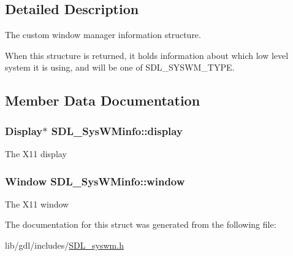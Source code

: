 \subsection{Detailed Description}
The custom window manager information structure.

When this structure is returned, it holds information about which low level system it is using, and will be one of S\+D\+L\+\_\+\+S\+Y\+S\+W\+M\+\_\+\+T\+Y\+P\+E. 

\subsection{Member Data Documentation}
\hypertarget{struct_s_d_l___sys_w_minfo_a58ef8bc8e1065e95e75a08d08f4a4741}{}
\subsubsection[{display}]{\setlength{\rightskip}{0pt plus 5cm}Display$\ast$ S\+D\+L\+\_\+\+Sys\+W\+Minfo\+::display}\label{struct_s_d_l___sys_w_minfo_a58ef8bc8e1065e95e75a08d08f4a4741}
The X11 display \hypertarget{struct_s_d_l___sys_w_minfo_a83ca4b0f4bdf67a0edee03d5bde86b93}{}
\subsubsection[{window}]{\setlength{\rightskip}{0pt plus 5cm}Window S\+D\+L\+\_\+\+Sys\+W\+Minfo\+::window}\label{struct_s_d_l___sys_w_minfo_a83ca4b0f4bdf67a0edee03d5bde86b93}
The X11 window 

The documentation for this struct was generated from the following file\+:\begin{DoxyCompactItemize}
\item 
lib/gdl/includes/\hyperlink{_s_d_l__syswm_8h}{S\+D\+L\+\_\+syswm.\+h}\end{DoxyCompactItemize}
